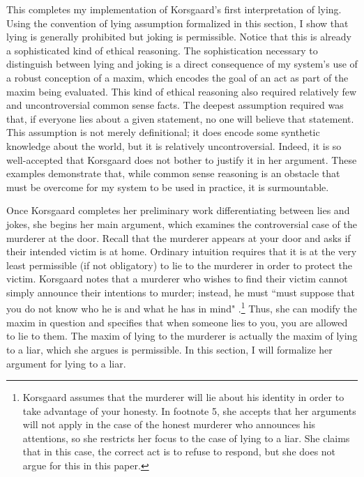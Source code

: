 \begin{isabellebody}
\endisatagproof
{\isafoldproof}%
%
\isadelimproof
%
\endisadelimproof
%
\begin{isamarkuptext}%
This completes my implementation of Korsgaard's first interpretation of lying. Using the convention
of lying assumption formalized in this section, I show that lying is generally prohibited but joking
is permissible. Notice that this is already a sophisticated kind of ethical reasoning. The sophistication
necessary to distinguish between lying and joking is a direct consequence of my system's use of a robust
conception of a maxim, which encodes the goal of an act as part of the maxim being evaluated. This kind 
of ethical reasoning also required relatively few and uncontroversial common sense facts. The deepest
assumption required was that, if everyone lies about a given statement, no one will believe that 
statement. This assumption is not merely definitional; it does encode some synthetic knowledge about the 
world, but it is relatively uncontroversial. Indeed, it is so well-accepted that Korsgaard does not 
bother to justify it in her argument. These examples demonstrate that, while common sense reasoning 
is an obstacle that must be overcome for my system to be used in practice, it is surmountable.%
\end{isamarkuptext}\isamarkuptrue%
%
\isadelimdocument
%
\endisadelimdocument
%
\isatagdocument
%
\isamarkuptrue%
%
\endisatagdocument
{\isafolddocument}%
%
\isadelimdocument
%
\endisadelimdocument
%
\begin{isamarkuptext}%
Once Korsgaard completes her preliminary work differentiating between lies and jokes, she begins her main
 argument, which examines the controversial case of the murderer at the door. Recall that the murderer
appears at your door and asks if their intended victim is at home. Ordinary intuition requires that it 
is at the very least permissible (if not obligatory) to lie to the murderer in order to protect the 
victim. Korsgaard notes that a murderer who wishes to find their victim cannot simply announce their
intentions to murder; instead, he must ``must suppose that you do not know who he is and
what he has in mind" \citep[5]{KorsgaaardRTL}.\footnote{Korsgaard assumes that the murderer will lie 
about his identity in order to take advantage of your honesty. In footnote 5, she accepts that her 
arguments will not apply in the case of the honest murderer who announces his attentions, so she 
restricts her focus to the case of lying to a liar. She claims that in this case, the correct act is 
to refuse to respond, but she does not argue for this in this paper.} Thus, she can modify the maxim in 
question and specifies that when someone lies to you, you are allowed to lie to them. The maxim of lying 
to the murderer is actually the maxim of lying to a liar, which she argues is permissible. In this section, I will 
formalize her argument for lying to a liar.


\end{isamarkuptext}
\end{isabellebody}
